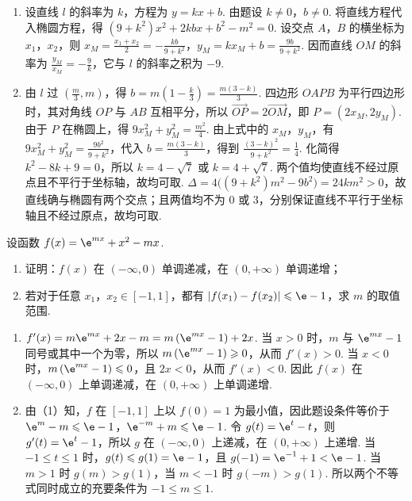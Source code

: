 \begin{solution}
\begin{enumerate}
\item 设直线 \(l\) 的斜率为 \(k\)，方程为 \(y=kx+b\). 由题设 \(k\ne0\)，\(b\ne0\). 将直线方程代入椭圆方程，得 \((9+k^2)x^2+2kbx+b^2-m^2=0\). 设交点 \(A\)，\(B\) 的横坐标为 \(x_1\)，\(x_2\)，则 \(x_M=\frac{x_1+x_2}{2}=-\frac{kb}{9+k^2}\)，\(y_M=kx_M+b=\frac{9b}{9+k^2}\). 因而直线 \(OM\) 的斜率为 \(\frac{y_M}{x_M}=-\frac9k\)，它与 \(l\) 的斜率之积为 \(-9\).
\item 由 \(l\) 过 \(\left(\frac{m}{3},m\right)\)，得 \(b=m\left(1-\frac{k}{3}\right)=\frac{m(3-k)}{3}\). 四边形 \(OAPB\) 为平行四边形时，其对角线 \(OP\) 与 \(AB\) 互相平分，所以 \(\overrightarrow{OP}=2\overrightarrow{OM}\)，即 \(P=(2x_M,2y_M)\). 由于 \(P\) 在椭圆上，得 \(9x_M^2+y_M^2=\frac{m^2}{4}\). 由上式中的 \(x_M\)，\(y_M\)，有 \(9x_M^2+y_M^2=\frac{9b^2}{9+k^2}\)，代入 \(b=\frac{m(3-k)}{3}\)，得到 \(\frac{(3-k)^2}{9+k^2}=\frac14\). 化简得 \(k^2-8k+9=0\)，所以 \(k=4-\sqrt7\) 或 \(k=4+\sqrt7\). 两个值均使直线不经过原点且不平行于坐标轴，故均可取.
\(\Delta=4\bigl((9+k^2)m^2-9b^2\bigr)=24km^2>0\)，故直线确与椭圆有两个交点；且两值均不为 \(0\) 或 \(3\)，分别保证直线不平行于坐标轴且不经过原点，故均可取.
\end{enumerate}
\end{solution}

\begin{problem}
设函数 \(f(x)=\e^{mx}+x^2-mx\).

\begin{enumerate}
\item 证明：\(f(x)\) 在 \((-\infty,0)\) 单调递减，在 \((0,+\infty)\) 单调递增；
\item 若对于任意 \(x_1\)，\(x_2\in[-1,1]\)，都有 \(\left|f(x_1)-f(x_2)\right|\leqslant \e-1\)，求 \(m\) 的取值范围.
\end{enumerate}
\end{problem}

\begin{solution}
\begin{enumerate}
\item \(f'(x)=m\e^{mx}+2x-m=m\left(\e^{mx}-1\right)+2x\). 当 \(x>0\) 时，\(m\) 与 \(\e^{mx}-1\) 同号或其中一个为零，所以 \(m\left(\e^{mx}-1\right)\geqslant0\)，从而 \(f'(x)>0\). 当 \(x<0\) 时，\(m\left(\e^{mx}-1\right)\leqslant0\)，且 \(2x<0\)，从而 \(f'(x)<0\). 因此 \(f(x)\) 在 \((-\infty,0)\) 上单调递减，在 \((0,+\infty)\) 上单调递增.
\item 由（1）知，\(f\) 在 \([-1,1]\) 上以 \(f(0)=1\) 为最小值，因此题设条件等价于 \(\e^m-m\leqslant\e-1\)，\(\e^{-m}+m\leqslant\e-1\). 令 \(g(t)=\e^t-t\)，则 \(g'(t)=\e^t-1\)，所以 \(g\) 在 \((-\infty,0)\) 上递减，在 \((0,+\infty)\) 上递增. 当 \(-1\leqslant t\leqslant1\) 时，\(g(t)\leqslant g(1)=\e-1\)，且 \(g(-1)=\e^{-1}+1<\e-1\). 当 \(m>1\) 时 \(g(m)>g(1)\)，当 \(m<-1\) 时 \(g(-m)>g(1)\). 所以两个不等式同时成立的充要条件为 \(-1\leqslant m\leqslant1\).
\end{enumerate}
\end{solution}

